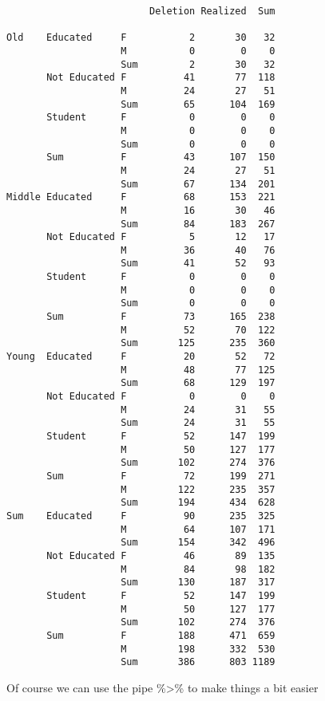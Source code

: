 \documentclass[
  12pt,
  letterpaper]{article}
\renewcommand\texttt[1]{{\ttfamily\color{BrickRed}#1}}
\begin{document}
\begin{verbatim}
                         Deletion Realized  Sum
                                               
Old    Educated     F           2       30   32
                    M           0        0    0
                    Sum         2       30   32
       Not Educated F          41       77  118
                    M          24       27   51
                    Sum        65      104  169
       Student      F           0        0    0
                    M           0        0    0
                    Sum         0        0    0
       Sum          F          43      107  150
                    M          24       27   51
                    Sum        67      134  201
Middle Educated     F          68      153  221
                    M          16       30   46
                    Sum        84      183  267
       Not Educated F           5       12   17
                    M          36       40   76
                    Sum        41       52   93
       Student      F           0        0    0
                    M           0        0    0
                    Sum         0        0    0
       Sum          F          73      165  238
                    M          52       70  122
                    Sum       125      235  360
Young  Educated     F          20       52   72
                    M          48       77  125
                    Sum        68      129  197
       Not Educated F           0        0    0
                    M          24       31   55
                    Sum        24       31   55
       Student      F          52      147  199
                    M          50      127  177
                    Sum       102      274  376
       Sum          F          72      199  271
                    M         122      235  357
                    Sum       194      434  628
Sum    Educated     F          90      235  325
                    M          64      107  171
                    Sum       154      342  496
       Not Educated F          46       89  135
                    M          84       98  182
                    Sum       130      187  317
       Student      F          52      147  199
                    M          50      127  177
                    Sum       102      274  376
       Sum          F         188      471  659
                    M         198      332  530
                    Sum       386      803 1189
\end{verbatim}

Of course we can use the pipe \texttt{\%\textgreater{}\%} to make things
a bit easier
\end{document}

